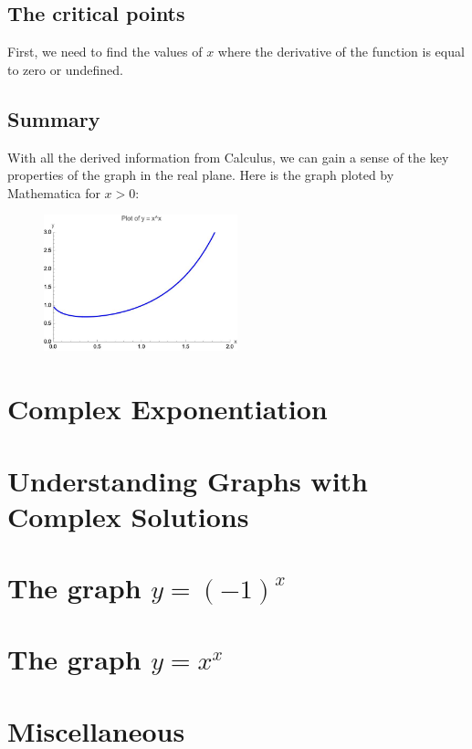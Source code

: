 \documentclass[12pt]{article}
\begin{document}
\subsection{The critical points}
First, we need to find the values of $x$ where the derivative of the function is equal to zero or undefined.
\subsection{Summary}


With all the derived information from Calculus, we can gain a sense of the key properties of the graph in the real plane. Here is the graph ploted by Mathematica for $x>0$:
\begin{figure}[h]
    \centering
    \includegraphics[width=0.5\textwidth]{x-power-x-real.jpeg}
    \label{fig:realPlot}
\end{figure}  
\section{Complex Exponentiation}

\section{Understanding Graphs with Complex Solutions}

\section[Math in Section]{The graph $y = (-1)^x$}

\section[Math in Section]{The graph $y = x^x$}

\section{Miscellaneous}
\end{document}
